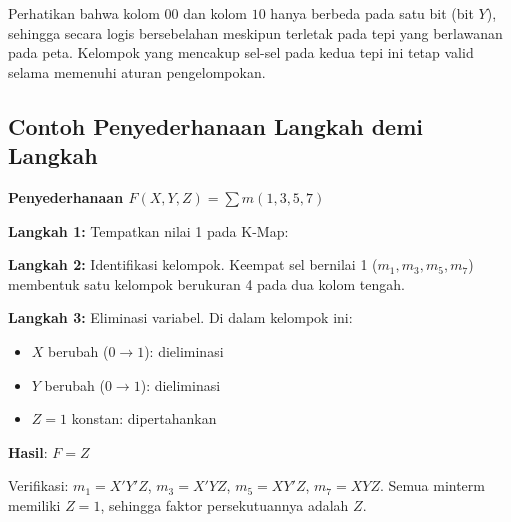 Perhatikan bahwa kolom $00$ dan kolom $10$ hanya berbeda pada satu bit (bit $Y$), sehingga secara logis bersebelahan meskipun terletak pada tepi yang berlawanan pada peta. Kelompok yang mencakup sel-sel pada kedua tepi ini tetap valid selama memenuhi aturan pengelompokan.

\subsection{Contoh Penyederhanaan Langkah demi Langkah}

\begin{contoh}
\textbf{Penyederhanaan $F(X,Y,Z) = \sum m(1, 3, 5, 7)$}

\textbf{Langkah 1:} Tempatkan nilai 1 pada K-Map:

\begin{center}
\end{center}

\textbf{Langkah 2:} Identifikasi kelompok. Keempat sel bernilai 1 ($m_1, m_3, m_5, m_7$) membentuk satu kelompok berukuran 4 pada dua kolom tengah.

\textbf{Langkah 3:} Eliminasi variabel. Di dalam kelompok ini:
\begin{itemize}
    \item $X$ berubah ($0 \rightarrow 1$): dieliminasi
    \item $Y$ berubah ($0 \rightarrow 1$): dieliminasi
    \item $Z = 1$ konstan: dipertahankan
\end{itemize}

\textbf{Hasil}: $F = Z$

Verifikasi: $m_1 = X'Y'Z$, $m_3 = X'YZ$, $m_5 = XY'Z$, $m_7 = XYZ$. Semua minterm memiliki $Z = 1$, sehingga faktor persekutuannya adalah $Z$.
\end{contoh}

